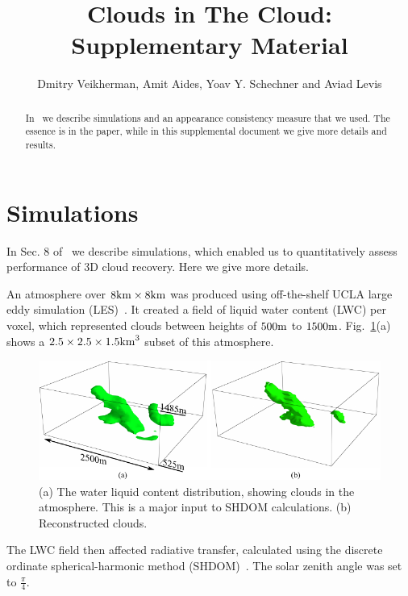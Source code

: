 \documentclass[runningheads]{llncs}
\begin{document}
\pagestyle{headings}
\mainmatter

\title{Clouds in The Cloud:\\
Supplementary Material}


\author{Dmitry Veikherman, Amit Aides, Yoav Y. Schechner and Aviad Levis}

\maketitle
\begin{abstract}
In~\cite{danny2014} we describe simulations and an appearance consistency measure that we used. The essence is in the paper, while in this supplemental document we give more details and results.

\end{abstract}

\section{Simulations}

In Sec. 8 of~\cite{danny2014} we describe simulations, which enabled us to quantitatively assess performance of 3D cloud recovery. Here we give more details.

An atmosphere over $8{\rm km}\times 8{\rm km}$  was produced using off-the-shelf UCLA large eddy simulation (LES)~\cite{stevens_evaluation_2005}. It created a field of liquid water content (LWC) per voxel, which represented clouds between heights of $500{\rm m}$ to $1500{\rm m}$. Fig.~\ref{fig:simulation_imgs2}(a) shows a $2.5\times 2.5\times 1.5{\rm km}^3$ subset of this atmosphere.
\begin{figure}
  \begin{center}
    \includegraphics{clouds3d_SHDOM}
    \caption{(a) The water liquid content distribution, showing clouds in the atmosphere.
     This is a major input to SHDOM calculations. (b)
      Reconstructed clouds.}
    \label{fig:simulation_imgs2}
  \end{center}
\end{figure}
The LWC field then affected radiative transfer, calculated using the discrete ordinate spherical-harmonic method (SHDOM)~\cite{Evans1998}. The solar zenith angle was set to $\frac{\pi}{4}$.
\end{document}
